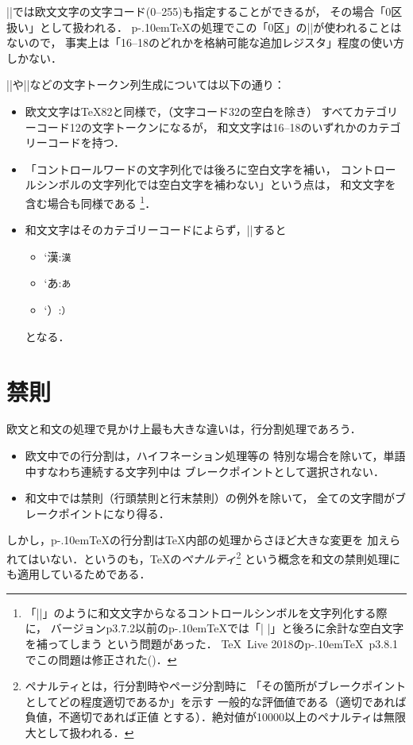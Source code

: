 \documentclass[a4paper,11pt,nomag]{jsarticle}
\def\pTeX{p\kern-.10em\TeX}
\begin{document}
\begin{dangerous}
  |\kcatcode|では欧文文字の文字コード(0--255)も指定することができるが，
  その場合「0区扱い」として扱われる．
  \pTeX の処理でこの「0区」の|\kcatcode|が使われることはないので，
  事実上は「16--18のどれかを格納可能な追加レジスタ」程度の使い方しかない．
\end{dangerous}

|\string|や|\meaning|などの文字トークン列生成については以下の通り：
\begin{itemize}
  \item 欧文文字は\TeX82と同様で，（文字コード32の空白を除き）
    すべてカテゴリーコード12の文字トークンになるが，
    和文文字は16--18のいずれかのカテゴリーコードを持つ．
  \item 「コントロールワードの文字列化では後ろに空白文字を補い，
    コントロールシンボルの文字列化では空白文字を補わない」という点は，
    和文文字を含む場合も同様である
    \footnote{「|\】|」のように和文文字からなるコントロールシンボルを文字列化する際に，
      バージョンp3.7.2以前の\pTeX では「|\】 |」と後ろに余計な空白文字を補ってしまう
      という問題があった．
      \TeX~Live 2018の\pTeX~p3.8.1でこの問題は修正された(\cite{build37})．}．
  \item 和文文字はそのカテゴリーコードによらず，|\meaning|すると
    \begin{itemize}
      \item \the\kcatcode`漢:\quad \texttt{\meaning 漢}
      \item \the\kcatcode`あ:\quad \texttt{\meaning あ}
      \item \the\kcatcode`）:\quad \texttt{\meaning ）}
    \end{itemize}
    となる．
\end{itemize}

\section{禁則}
\label{sec:kinsoku}
欧文と和文の処理で見かけ上最も大きな違いは，行分割処理であろう．
\begin{itemize}
\item 欧文中での行分割は，ハイフネーション処理等の
      特別な場合を除いて，単語中すなわち連続する文字列中は
      ブレークポイントとして選択されない．
\item 和文中では禁則（行頭禁則と行末禁則）の例外を除いて，
      全ての文字間がブレークポイントになり得る．
\end{itemize}
しかし，\pTeX の行分割は\TeX 内部の処理からさほど大きな変更を
加えられてはいない．というのも，\TeX の\emph{ペナルティ}\footnote{%
ペナルティとは，行分割時やページ分割時に
「その箇所がブレークポイントとしてどの程度適切であるか」を示す
一般的な評価値である（適切であれば負値，不適切であれば正値
とする）．絶対値が10000以上のペナルティは無限大として扱われる．}%
という概念を和文の禁則処理にも適用しているためである．
\end{document}
